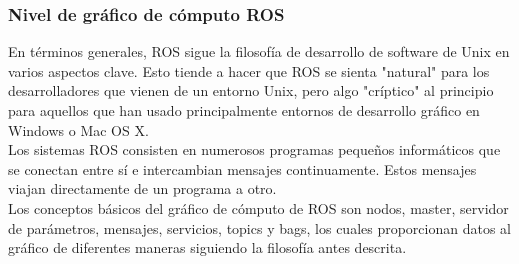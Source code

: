 \subsubsection{Nivel de gráfico de cómputo ROS}
En términos generales, ROS sigue la filosofía de desarrollo de software de Unix
en varios aspectos clave. Esto tiende a hacer que ROS se sienta "natural" para los
desarrolladores que vienen de un entorno Unix, pero algo "críptico" al principio
para aquellos que han usado principalmente entornos de desarrollo gráfico en
Windows o Mac OS X.\cite{Book:Morgan2015}\\
Los sistemas ROS consisten en numerosos programas pequeños informáticos que se
conectan entre sí e intercambian mensajes continuamente. Estos mensajes viajan
directamente de un programa a otro.\\
Los conceptos básicos del gráfico de cómputo de ROS son nodos, master,
servidor de parámetros, mensajes, servicios, topics y bags, los cuales
proporcionan datos al gráfico de diferentes maneras siguiendo la filosofía
antes descrita.
